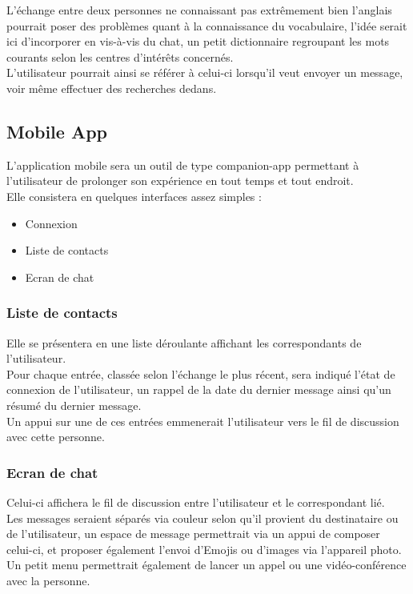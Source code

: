 \documentclass[a4paper,10pt,final,fleqn]{article}
\begin{document}
				L'échange entre deux personnes ne connaissant pas extrêmement bien l'anglais pourrait poser des problèmes quant à la connaissance du vocabulaire, l'idée serait ici d'incorporer en vis-à-vis du chat, un petit dictionnaire regroupant les mots courants selon les centres d'intérêts concernés.\\
				L'utilisateur pourrait ainsi se référer à celui-ci lorsqu'il veut envoyer un message, voir même effectuer des recherches dedans.\\

		\subsection{Mobile App}

			L'application mobile sera un outil de type companion-app permettant à l'utilisateur de prolonger son expérience en tout temps et tout endroit.\\

			Elle consistera en quelques interfaces assez simples : \\

			\begin{itemize}
				\item Connexion
				\item Liste de contacts
				\item Ecran de chat
			\end{itemize}

			\subsubsection{Liste de contacts}

				Elle se présentera en une liste déroulante affichant les correspondants de l'utilisateur.\\
				Pour chaque entrée, classée selon l'échange le plus récent, sera indiqué l'état de connexion de l'utilisateur, un rappel de la date du dernier message ainsi qu'un résumé du dernier message.\\

				Un appui sur une de ces entrées emmenerait l'utilisateur vers le fil de discussion avec cette personne.\\

			\subsubsection{Ecran de chat}

				Celui-ci affichera le fil de discussion entre l'utilisateur et le correspondant lié.\\
				Les messages seraient séparés via couleur selon qu'il provient du destinataire ou de l'utilisateur, un espace de message permettrait via un appui de composer celui-ci, et proposer également l'envoi d'Emojis ou d'images via l'appareil photo.\\
				Un petit menu permettrait également de lancer un appel ou une vidéo-conférence avec la personne.\\
\end{document}
